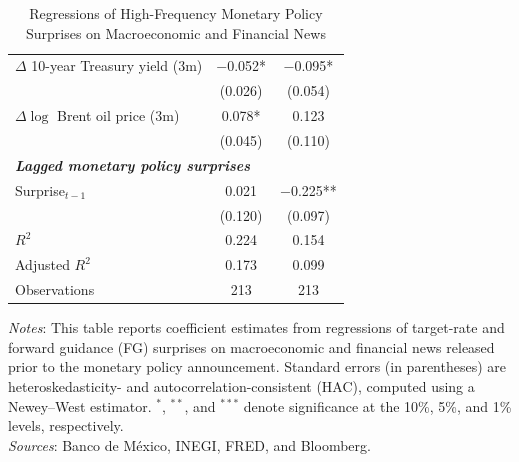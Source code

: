 \begin{table}[t]
\begin{center}
{\begin{tabular}{lcc}
$\Delta$ 10-year Treasury yield (3m)  
& $-$0.052* 
& $-$0.095*  \\
& (0.026) 
& (0.054) \\

$\Delta \log$ Brent oil price (3m)       
& 0.078* 
& 0.123  \\
& (0.045) 
& (0.110) \\[0.4em]

\multicolumn{3}{l}{\textbf{\emph{Lagged monetary policy surprises}}} \\[0.2em]
Surprise$_{t-1}$                      
& 0.021  
& $-$0.225** \\
& (0.120)  
& (0.097) \\[0.4em]

\midrule
$R^2$              & 0.224 & 0.154 \\
Adjusted $R^2$     & 0.173 & 0.099 \\
Observations       & 213   & 213   \\
\bottomrule
\end{tabular}}
\caption{Regressions of High-Frequency Monetary Policy Surprises on Macroeconomic and Financial News}
\end{center}
\begin{footnotesize}
\textit{Notes}: This table reports coefficient estimates from regressions of target-rate and forward guidance (FG) surprises on macroeconomic and financial news released prior to the monetary policy announcement. Standard errors (in parentheses) are heteroskedasticity- and autocorrelation-consistent (HAC), computed using a Newey--West estimator. $^{*}$, $^{**}$, and $^{***}$ denote significance at the 10\%, 5\%, and 1\% levels, respectively. \\
\textit{Sources}: Banco de México, INEGI, FRED, and Bloomberg.
\end{footnotesize}
\end{table}
